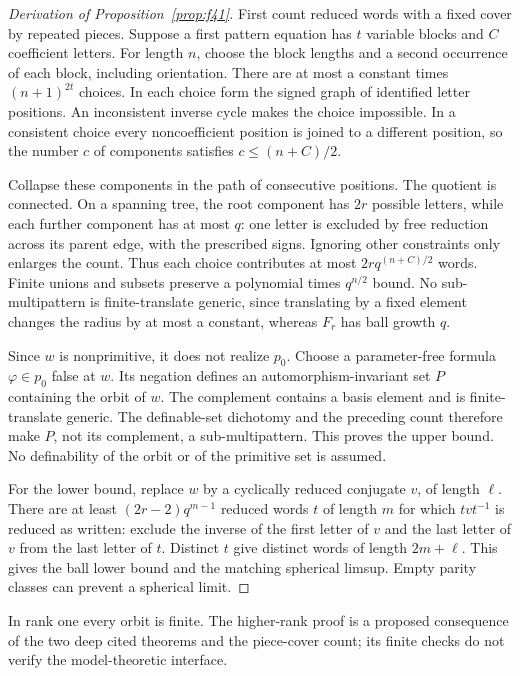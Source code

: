 \begin{proof}[Derivation of Proposition~\ref{prop:f41}]
First count reduced words with a fixed cover by repeated pieces. Suppose
a first pattern equation has $t$ variable blocks and $C$ coefficient
letters. For length $n$, choose the block lengths and a second occurrence
of each block, including orientation. There are at most a constant
times $(n+1)^{2t}$ choices. In each choice form the signed graph of
identified letter positions. An inconsistent inverse cycle makes the
choice impossible. In a consistent choice every noncoefficient position
is joined to a different position, so the number $c$ of components
satisfies $c\le(n+C)/2$.

Collapse these components in the path of consecutive positions. The
quotient is connected. On a spanning tree, the root component has
$2r$ possible letters, while each further component has at most $q$:
one letter is excluded by free reduction across its parent edge, with
the prescribed signs. Ignoring other constraints only enlarges the
count. Thus each choice contributes at most $2r q^{(n+C)/2}$ words.
Finite unions and subsets preserve a polynomial times $q^{n/2}$ bound.
No sub-multipattern is finite-translate generic, since translating by
a fixed element changes the radius by at most a constant, whereas
$F_r$ has ball growth $q$.

Since $w$ is nonprimitive, it does not realize $p_0$. Choose a
parameter-free formula $\varphi\in p_0$ false at $w$. Its negation
defines an automorphism-invariant set $P$ containing the orbit of $w$.
The complement contains a basis element and is finite-translate generic.
The definable-set dichotomy and the preceding count therefore make $P$,
not its complement, a sub-multipattern. This proves the upper bound.
No definability of the orbit or of the primitive set is assumed.

For the lower bound, replace $w$ by a cyclically reduced conjugate $v$,
of length $\ell$. There are at least $(2r-2)q^{m-1}$ reduced words
$t$ of length $m$ for which $tvt^{-1}$ is reduced as written: exclude
the inverse of the first letter of $v$ and the last letter of $v$ from
the last letter of $t$. Distinct $t$ give distinct words of length
$2m+\ell$. This gives the ball lower bound and the matching spherical
limsup. Empty parity classes can prevent a spherical limit.
\end{proof}

In rank one every orbit is finite. The higher-rank proof is a proposed
consequence of the two deep cited theorems and the piece-cover count;
its finite checks do not verify the model-theoretic interface.

